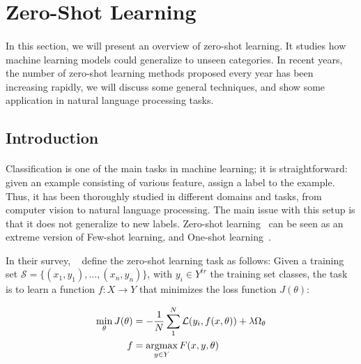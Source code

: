 \section{Zero-Shot Learning} 
\label{sec:zero_learning}

\paragraph{}

In this section, we will present an overview of zero-shot learning. It studies how machine learning models could generalize to unseen categories.  In recent years, the number of zero-shot learning methods proposed every year has been increasing rapidly, we will discuss some general techniques, and show some application in natural language processing tasks. %

\subsection{Introduction}
\paragraph{}
Classification is one of the main tasks in machine learning; it is straightforward: given an example consisting of various feature, assign a label to the example. Thus, it has been thoroughly studied in different domains and tasks, from computer vision to natural language processing.  The main issue with this setup is that it does not generalize to new labels. Zero-shot learning~\citep{larochelle2008zeroshot} can be seen as an extreme version of Few-shot learning, and One-shot learning~\citep{miller2002oneshot}.

In their survey, ~\citet{xian2017zero} define the zero-shot learning task as follows: Given a training set $\mathcal{S} = \{(x_1, y_1), \dots, (x_n, y_n)\}$, with $y_i \in Y^{tr}$ the training set classes, the task is to learn a function $f: X \rightarrow Y$ that minimizes the loss function $J(\theta)$: 

\begin{equation}
\begin{split}
    \min_{\theta} J(\theta) & = - \frac{1}{N} \sum_{1}^{N} \mathcal{L}(y_i, f(x, \theta)) + \lambda \Omega_\theta \\
    f & = \operatorname*{argmax}_{y \in Y} F(x, y, \theta)
\end{split}
\end{equation}

